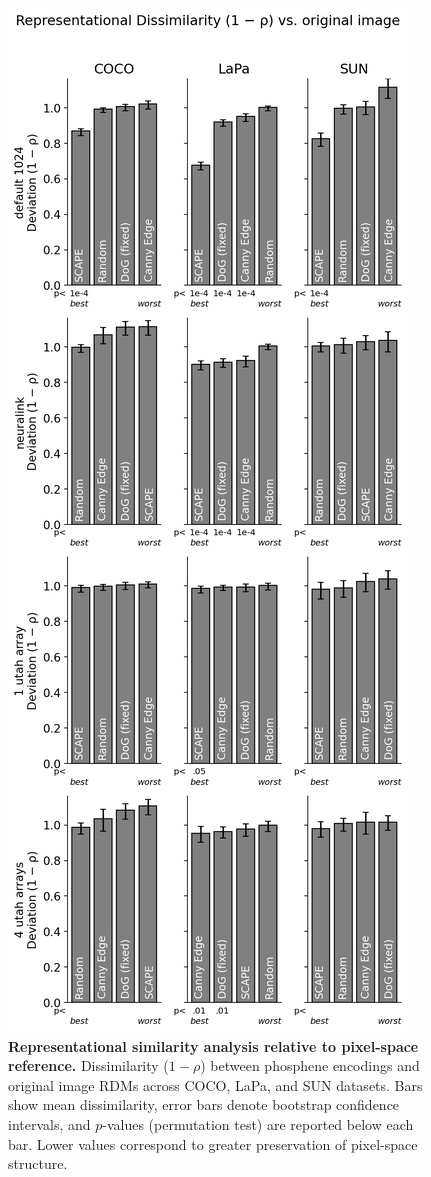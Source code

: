 \begin{figure}[t!]
    \centering
    \includegraphics[width=0.9\columnwidth]{figures/RSA.png}
    \caption{\textbf{Representational similarity analysis relative to pixel-space reference.} 
    Dissimilarity ($1-\rho$) between phosphene encodings and original image RDMs across COCO, LaPa, and SUN datasets. 
    Bars show mean dissimilarity, error bars denote bootstrap confidence intervals, and $p$-values (permutation test) are reported below each bar. 
    Lower values correspond to greater preservation of pixel-space structure.}
    \label{fig:rsa_pixel}
\end{figure}

